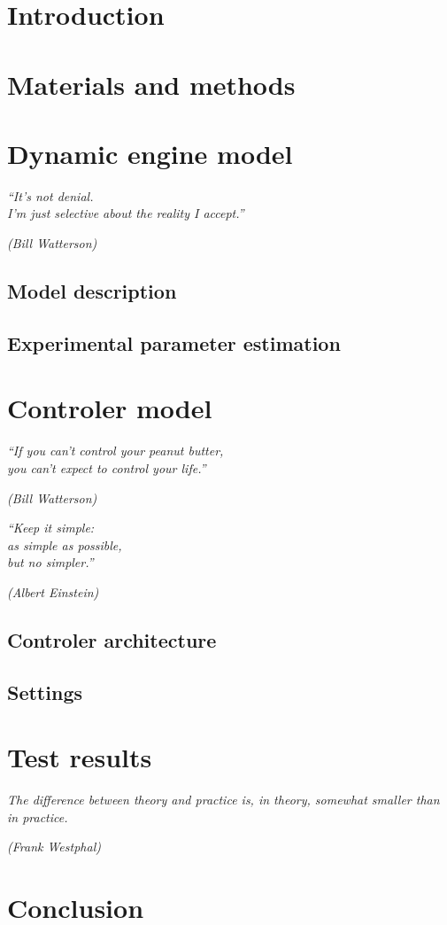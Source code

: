 \textual

\chapter{Introduction}

\chapter{Materials and methods}

\chapter{Dynamic engine model}
\epigraph{\em ``It's not denial.\\ I'm just selective about the reality I
accept.''}{\em(Bill Watterson)}
\section{Model description}
\section{Experimental parameter estimation}

\chapter{Controler model}
\epigraph{\em ``If you can't control your peanut butter,\\ you can't expect to
control your life.''}{\em(Bill Watterson)}
\epigraph{\em ``Keep it simple:\\
as simple as possible,\\
but no simpler.''}{\em (Albert Einstein)}
\section{Controler architecture}
\section{Settings}

\chapter{Test results}
\epigraph{\em The difference between theory and practice is, in theory, somewhat
smaller than in practice.}{\em (Frank Westphal)}

\chapter{Conclusion}
